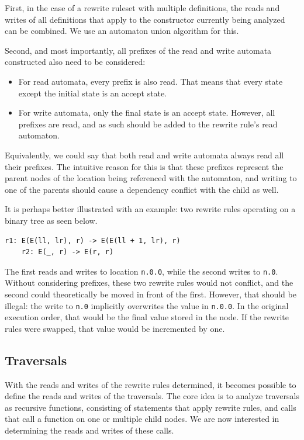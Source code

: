 First, in the case of a rewrite ruleset with multiple definitions, the reads and writes of all definitions that apply to the constructor currently being analyzed can be combined. We use an automaton union algorithm for this.

Second, and most importantly, all prefixes of the read and write automata constructed also need to be considered:

\begin{itemize}
    \item For read automata, every prefix is also read. That means that every state except the initial state is an accept state.
    \item For write automata, only the final state is an accept state. However, all prefixes are read, and as such should be added to the rewrite rule's read automaton.
\end{itemize}

Equivalently, we could say that both read and write automata always read all their prefixes. The intuitive reason for this is that these prefixes represent the parent nodes of the location being referenced with the automaton, and writing to one of the parents should cause a dependency conflict with the child as well.

It is perhaps better illustrated with an example: two rewrite rules operating on a binary tree as seen below.

\begin{lstlisting}[style = mystyle_ex_stratego_program]
    r1: E(E(ll, lr), r) -> E(E(ll + 1, lr), r)
    r2: E(_, r) -> E(r, r)
\end{lstlisting}

The first reads and writes to location \texttt{n.0.0}, while the second writes to \texttt{n.0}. Without considering prefixes, these two rewrite rules would not conflict, and the second could theoretically be moved in front of the first. However, that should be illegal: the write to \texttt{n.0} implicitly overwrites the value in \texttt{n.0.0}. In the original execution order, that would be the final value stored in the node. If the rewrite rules were swapped, that value would be incremented by one.

\subsection{Traversals}
With the reads and writes of the rewrite rules determined, it becomes possible to define the reads and writes of the traversals. The core idea is to analyze traversals as recursive functions, consisting of statements that apply rewrite rules, and calls that call a function on one or multiple child nodes. We are now interested in determining the reads and writes of these calls.

